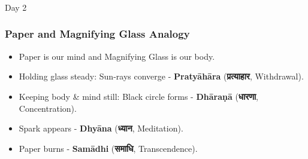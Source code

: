 	  

\begin{frame}[fragile]\frametitle{}
\begin{center}
{\Large Day 2}
\end{center}
\end{frame}


\begin{frame}[fragile]\frametitle{Paper and Magnifying Glass Analogy}
      \begin{itemize}
      \item Paper is our mind and Magnifying Glass is our body.
      \item Holding glass steady: Sun-rays converge - \textbf{Pratyāhāra} (\textbf{प्रत्याहार}, Withdrawal).
      \item Keeping body \& mind still: Black circle forms - \textbf{Dhāraṇā} (\textbf{धारणा}, Concentration).
      \item Spark appears - \textbf{Dhyāna} (\textbf{ध्यान}, Meditation).
      \item Paper burns - \textbf{Samādhi} (\textbf{समाधि}, Transcendence).
      \end{itemize}
\end{frame}

